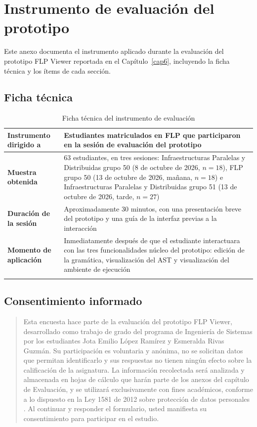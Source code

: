 \chapter{Instrumento de evaluación del prototipo}
\label{annex:eval-instrumento}

Este anexo documenta el instrumento aplicado durante la evaluación del prototipo FLP Viewer reportada en el Capítulo~\ref{cap6}, incluyendo la ficha técnica y los ítems de cada sección.

\section{Ficha técnica}

\begin{longtable}{|>{\bfseries}p{4cm}|p{10.5cm}|}
\hline
Instrumento dirigido a & Estudiantes matriculados en FLP que participaron en la sesión de evaluación del prototipo \\
\hline
Muestra obtenida & 63 estudiantes, en tres sesiones: Infraestructuras Paralelas y Distribuidas grupo 50 (8 de octubre de 2026, $n = 18$), FLP grupo 50 (13 de octubre de 2026, mañana, $n = 18$) e Infraestructuras Paralelas y Distribuidas grupo 51 (13 de octubre de 2026, tarde, $n = 27$) \\
\hline
Duración de la sesión & Aproximadamente 30 minutos, con una presentación breve del prototipo y una guía de la interfaz previas a la interacción \\
\hline
Momento de aplicación & Inmediatamente después de que el estudiante interactuara con las tres funcionalidades núcleo del prototipo: edición de la gramática, visualización del AST y visualización del ambiente de ejecución \\
\hline
\caption{Ficha técnica del instrumento de evaluación}
\label{tab:ficha-instrumento}
\end{longtable}

\section{Consentimiento informado}
\label{annex:eval-consentimiento}

\begin{quote}
Esta encuesta hace parte de la evaluación del prototipo FLP Viewer, desarrollado como trabajo de grado del programa de Ingeniería de Sistemas por los estudiantes Jota Emilio López Ramírez y Esmeralda Rivas Guzmán. Su participación es voluntaria y anónima, no se solicitan datos que permitan identificarlo y sus respuestas no tienen ningún efecto sobre la calificación de la asignatura. La información recolectada será analizada y almacenada en hojas de cálculo que harán parte de los anexos del capítulo de Evaluación, y se utilizará exclusivamente con fines académicos, conforme a lo dispuesto en la Ley 1581 de 2012 sobre protección de datos personales \cite{colombia2012ley1581}. Al continuar y responder el formulario, usted manifiesta su consentimiento para participar en el estudio.
\end{quote}

